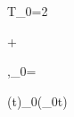 T_0=2\pi{}

\ddot{\theta}+\sin{}

\sin\theta\approx\theta,\qquad \omega_0=

\theta(t)\approx\theta_0\cos(\omega_0t)
